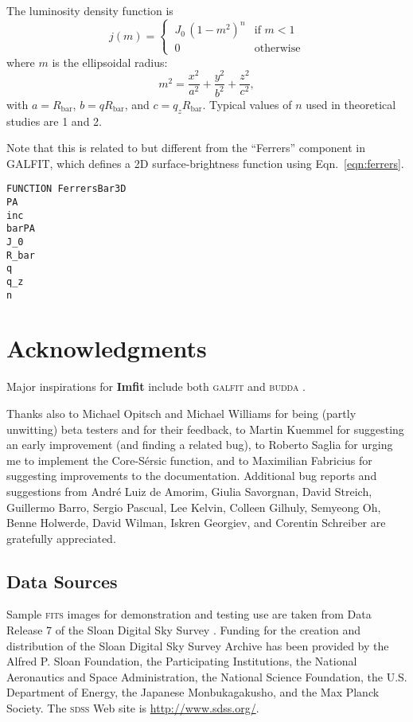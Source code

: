 \documentclass[10pt,a4paper,article]{memoir}
\newcommand{\Imfit}{\textbf{Imfit}}
\newcommand{\rbar}{\ensuremath{R_{\mathrm{bar}}}}
\begin{document}
The luminosity density function is
\begin{equation}\label{eqn:ferrers}
 j(m) = 
  \begin{cases} 
   \: J_0 \, (1 - m^{2})^{n} & \text{if } m < 1 \\
   \: 0                      & \text{otherwise}
  \end{cases}
\end{equation}
where $m$ is the ellipsoidal radius:
\begin{equation}
m^2 =  \frac{x^2}{a^2} + \frac{y^2}{b^2} + \frac{z^2}{c^2} ,
\end{equation}
with $a = \rbar$, $b = q \rbar$, and $c = q_{z} \rbar$. Typical values of $n$
used in theoretical studies are 1 and 2.

Note that this is related to but different from the ``Ferrers'' component
in GALFIT, which defines a 2D surface-brightness function using Eqn.~\ref{eqn:ferrers}.

\begin{verbatim}
FUNCTION FerrersBar3D
PA
inc
barPA
J_0
R_bar
q
q_z
n
\end{verbatim}




\chapter{Acknowledgments}

Major inspirations for \Imfit{} include both \textsc{galfit} \citep{peng02,peng10} and 
\textsc{budda} \citep{desouza04,gadotti08}.

Thanks also to Michael Opitsch and Michael Williams for being (partly
unwitting) beta testers and for their feedback, to Martin Kuemmel for
suggesting an early improvement (and finding a related bug), to Roberto
Saglia for urging me to implement the Core-S{\'e}rsic function, and to
Maximilian Fabricius for suggesting improvements to the documentation.
Additional bug reports and suggestions from Andr{\'e} Luiz de Amorim,
Giulia Savorgnan, David Streich, Guillermo Barro, Sergio Pascual, Lee
Kelvin, Colleen Gilhuly, Semyeong Oh, Benne Holwerde, David Wilman, 
Iskren Georgiev, and Corentin Schreiber are gratefully appreciated.


\section{Data Sources}

Sample \textsc{fits} images for demonstration and testing use are taken
from Data Release 7 \citep{abazajian09} of the Sloan Digital Sky Survey
\citep{york00}. Funding for the creation and distribution of the Sloan
Digital Sky Survey Archive has been provided by the Alfred P. Sloan
Foundation, the Participating Institutions, the National Aeronautics and
Space Administration, the National Science Foundation, the U.S.
Department of Energy, the Japanese Monbukagakusho, and the Max Planck
Society. The \textsc{sdss} Web site is \url{http://www.sdss.org/}.
\end{document}
